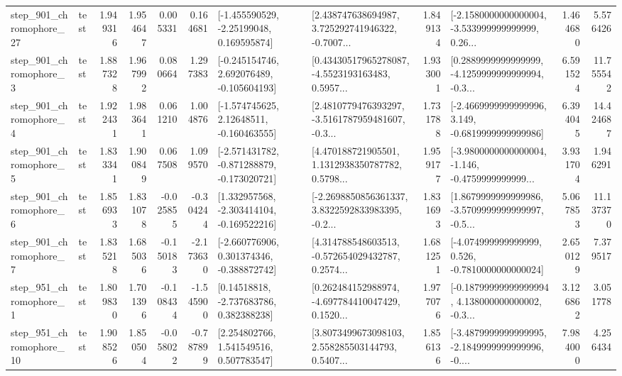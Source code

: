 \begin{tabular}{llrrrrllrlrr}
  step\_901\_chromophore\_27 &      test &      1.949316 &    1.954647 &      0.005331 &  0.164681 &    [-1.455590529, -2.25199048, 0.169595874] &  [2.438747638694987, 3.725292741946322, -0.7007... &       1.849134 &  [-2.1580000000000004, -3.533999999999999, 0.26... &            1.464680 &          5.576426 \\
   step\_901\_chromophore\_3 &      test &      1.887328 &    1.967992 &      0.080664 &  1.297383 &   [-0.245154746, 2.692076489, -0.105604193] &  [0.43430517965278087, -4.5523193163483, 0.5957... &       1.933001 &  [0.2889999999999999, -4.1259999999999994, -0.3... &            6.591524 &         11.755542 \\
   step\_901\_chromophore\_4 &      test &      1.922431 &    1.983641 &      0.061210 &  1.004876 &    [-1.574745625, 2.12648511, -0.160463555] &  [2.4810779476393297, -3.5161787959481607, -0.3... &       1.731788 &  [-2.4669999999999996, 3.149, -0.6819999999999986] &            6.394045 &         14.424687 \\
   step\_901\_chromophore\_5 &      test &      1.833341 &    1.900849 &      0.067508 &  1.099570 &  [-2.571431782, -0.871288879, -0.173020721] &  [4.470188721905501, 1.1312938350787782, 0.5798... &       1.959177 &  [-3.9800000000000004, -1.146, -0.4759999999999... &            3.931704 &          1.946291 \\
   step\_901\_chromophore\_6 &      test &      1.856933 &    1.831078 &     -0.025855 & -0.304244 &   [1.332957568, -2.303414104, -0.169522216] &  [-2.2698850856361337, 3.8322592833983395, -0.2... &       1.831693 &  [1.8679999999999986, -3.5709999999999997, -0.5... &            5.067853 &         11.137370 \\
   step\_901\_chromophore\_7 &      test &      1.835218 &    1.685036 &     -0.150183 & -2.173630 &   [-2.660776906, 0.301374346, -0.388872742] &  [4.314788548603513, -0.572654029432787, 0.2574... &       1.681251 &   [-4.074999999999999, 0.526, -0.7810000000000024] &            2.650129 &          7.379517 \\
   step\_951\_chromophore\_1 &      test &      1.809830 &    1.701396 &     -0.108434 & -1.545900 &     [0.14518818, -2.737683786, 0.382388238] &  [0.262484152988974, -4.697784410047429, 0.1520... &       1.977076 &  [-0.18799999999999994, 4.138000000000002, -0.3... &            3.126862 &          3.051778 \\
  step\_951\_chromophore\_10 &      test &      1.908526 &    1.850504 &     -0.058022 & -0.787899 &     [2.254802766, 1.541549516, 0.507783547] &  [3.8073499673098103, 2.558285503144793, 0.5407... &       1.856136 &  [-3.4879999999999995, -2.1849999999999996, -0.... &            7.984000 &          4.256434 \\

\end{tabular}
